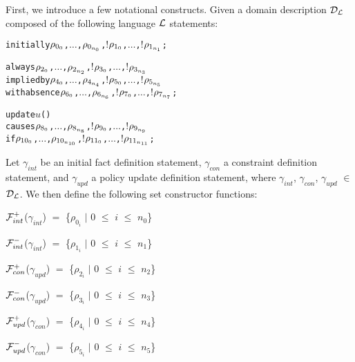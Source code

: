 \documentclass[11pt]{report}
\newenvironment{vverbatim}
{
  \begin{alltt}
}
{
    \vspace{-\baselineskip}
  \end{alltt}
}
\newenvironment{vquote}
{
  \begin{list}{}{\leftmargin 1em}\item[]
}
{
  \end{list}
}
\begin{document}
      First, we introduce a few notational constructs. Given a domain
      description ${\cal D_L}$ composed of the following language ${\cal L}$
      statements:

      \begin{vverbatim}
  initially \(\rho\sb{0\sb{0}}\), \(\ldots\), \(\rho\sb{0\sb{n\sb{0}}}\), \(!\)\(\rho\sb{1\sb{0}}\), \(\ldots\), \(!\)\(\rho\sb{1\sb{n\sb{1}}}\);

  always \(\rho\sb{2\sb{0}}\), \(\ldots\), \(\rho\sb{2\sb{n\sb{2}}}\), \(!\)\(\rho\sb{3\sb{0}}\), \(\ldots\), \(!\)\(\rho\sb{3\sb{n\sb{3}}}\)
    implied by \(\rho\sb{4\sb{0}}\), \(\ldots\), \(\rho\sb{4\sb{n\sb{4}}}\), \(!\)\(\rho\sb{5\sb{0}}\), \(\ldots\), \(!\)\(\rho\sb{5\sb{n\sb{5}}}\)
    with absence \(\rho\sb{6\sb{0}}\), \(\ldots\), \(\rho\sb{6\sb{n\sb{6}}}\), \(!\)\(\rho\sb{7\sb{0}}\), \(\ldots\), \(!\)\(\rho\sb{7\sb{n\sb{7}}}\);

  update \(u\)()
    causes \(\rho\sb{8\sb{0}}\), \(\ldots\), \(\rho\sb{8\sb{n\sb{8}}}\), \(!\)\(\rho\sb{9\sb{0}}\), \(\ldots\), \(!\)\(\rho\sb{9\sb{n\sb{9}}}\)
    if \(\rho\sb{10\sb{0}}\), \(\ldots\), \(\rho\sb{10\sb{n\sb{10}}}\), \(!\)\(\rho\sb{11\sb{0}}\), \(\ldots\), \(!\)\(\rho\sb{11\sb{n\sb{11}}}\);
      \end{vverbatim}

      Let $\gamma_{int}$ be an initial fact definition statement,
      $\gamma_{con}$ a constraint definition statement, and $\gamma_{upd}$
      a policy update definition statement, where $\gamma_{int}$,
      $\gamma_{con}$, $\gamma_{upd}$ $\in$ ${\cal D}_{\cal L}$. We then define
      the following set constructor functions:

      \begin{vquote}
        ${\cal F}^{+}_{int}$($\gamma_{int}$) $=$
          \{$\rho_{0_i}$ $\mid$ $0$ $\leq$ $i$ $\leq$ $n_0$\}

        ${\cal F}^{-}_{int}$($\gamma_{int}$) $=$
          \{$\rho_{1_i}$ $\mid$ $0$ $\leq$ $i$ $\leq$ $n_1$\}

        ${\cal F}^{+}_{con}$($\gamma_{upd}$) $=$
          \{$\rho_{2_i}$ $\mid$ $0$ $\leq$ $i$ $\leq$ $n_2$\}

        ${\cal F}^{-}_{con}$($\gamma_{upd}$) $=$
          \{$\rho_{3_i}$ $\mid$ $0$ $\leq$ $i$ $\leq$ $n_3$\}

        ${\cal F}^{+}_{upd}$($\gamma_{con}$) $=$
          \{$\rho_{4_i}$ $\mid$ $0$ $\leq$ $i$ $\leq$ $n_4$\}

        ${\cal F}^{-}_{upd}$($\gamma_{con}$) $=$
          \{$\rho_{5_i}$ $\mid$ $0$ $\leq$ $i$ $\leq$ $n_5$\}
      \end{vquote}
\end{document}
